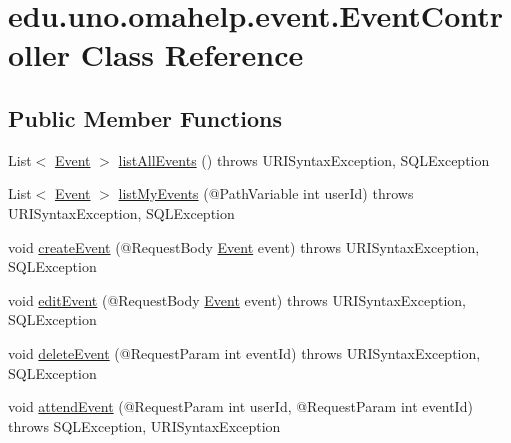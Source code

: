 \hypertarget{classedu_1_1uno_1_1omahelp_1_1event_1_1_event_controller}{}\section{edu.\+uno.\+omahelp.\+event.\+Event\+Controller Class Reference}
\label{classedu_1_1uno_1_1omahelp_1_1event_1_1_event_controller}
\subsection*{Public Member Functions}
\begin{DoxyCompactItemize}
\item 
List$<$ \mbox{\hyperlink{classedu_1_1uno_1_1omahelp_1_1event_1_1_event}{Event}} $>$ \mbox{\hyperlink{classedu_1_1uno_1_1omahelp_1_1event_1_1_event_controller_a3a0ce672a4dcadc4ad500d0ba7f5fdf8}{list\+All\+Events}} ()  throws U\+R\+I\+Syntax\+Exception, S\+Q\+L\+Exception 
\item 
List$<$ \mbox{\hyperlink{classedu_1_1uno_1_1omahelp_1_1event_1_1_event}{Event}} $>$ \mbox{\hyperlink{classedu_1_1uno_1_1omahelp_1_1event_1_1_event_controller_a829db25a4758bcb33dbc7735aad24ae4}{list\+My\+Events}} (@Path\+Variable int user\+Id)  throws U\+R\+I\+Syntax\+Exception, S\+Q\+L\+Exception 
\item 
void \mbox{\hyperlink{classedu_1_1uno_1_1omahelp_1_1event_1_1_event_controller_ae632d8ee353a9e82c4742a693924f83f}{create\+Event}} (@Request\+Body \mbox{\hyperlink{classedu_1_1uno_1_1omahelp_1_1event_1_1_event}{Event}} event)  throws U\+R\+I\+Syntax\+Exception, S\+Q\+L\+Exception 
\item 
void \mbox{\hyperlink{classedu_1_1uno_1_1omahelp_1_1event_1_1_event_controller_a69f49a3dd69d82c705e0de3566832d0b}{edit\+Event}} (@Request\+Body \mbox{\hyperlink{classedu_1_1uno_1_1omahelp_1_1event_1_1_event}{Event}} event)  throws U\+R\+I\+Syntax\+Exception, S\+Q\+L\+Exception 
\item 
void \mbox{\hyperlink{classedu_1_1uno_1_1omahelp_1_1event_1_1_event_controller_a6e08d5245406b049598da714e4bde5d6}{delete\+Event}} (@Request\+Param int event\+Id)  throws U\+R\+I\+Syntax\+Exception, S\+Q\+L\+Exception 
\item 
void \mbox{\hyperlink{classedu_1_1uno_1_1omahelp_1_1event_1_1_event_controller_aeb967fdf80fb5b9547c2dc360e8ab8c1}{attend\+Event}} (@Request\+Param int user\+Id, @Request\+Param int event\+Id)  throws S\+Q\+L\+Exception, U\+R\+I\+Syntax\+Exception 

\end{DoxyCompactItemize}
